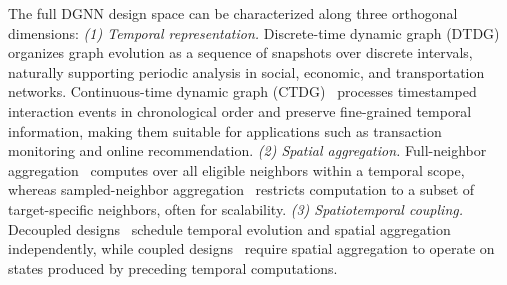 The full DGNN design space can be characterized along three orthogonal dimensions:
{\em (1) Temporal representation.} %
Discrete-time dynamic graph (DTDG)~\cite{mpnnlstm,dgnn_dt1} organizes graph evolution as a sequence of snapshots over discrete intervals, naturally supporting periodic analysis in social, economic, and transportation networks. 
Continuous-time dynamic graph (CTDG)~\cite{dgnn_ct1,dyg} processes timestamped interaction events in chronological order and preserve fine-grained temporal information, making them suitable for applications such as transaction monitoring and online recommendation. 
{\em (2) Spatial aggregation.} %
Full-neighbor aggregation~\cite{evolvegcn, tgcn} computes over all eligible neighbors within a temporal scope, whereas sampled-neighbor aggregation~\cite{tgn,dgnn_ct1} restricts computation to a subset of target-specific neighbors, often for scalability.
{\em (3) Spatiotemporal coupling.} %
Decoupled designs~\cite{ctdg_decouple} schedule temporal evolution and spatial aggregation independently, while coupled designs~\cite{tgn} require spatial aggregation to operate on states produced by preceding temporal computations.

